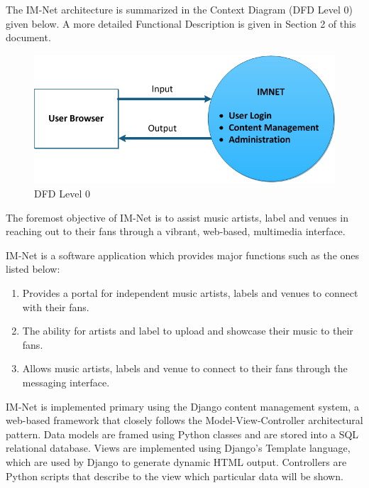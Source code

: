\documentclass[letterpaper]{article}
\begin{document}
The IM-Net architecture is summarized in the Context Diagram (DFD Level 0) given below. A more detailed Functional Description is given in Section 2 of this document.\\

\begin{figure}[h]
\centering
\includegraphics{DFD_level_0.png}
\caption{DFD Level 0}
\label{fig:DFD_level_0}
\end{figure}
\eject

The foremost objective of IM-Net is to assist music artists, label and venues in reaching out to their fans through a vibrant, web-based, multimedia interface.

IM-Net is a software application which provides major functions such as the ones listed below:

\begin{enumerate}
\item  Provides a portal for independent music artists, labels and venues to connect with their fans.

\item  The ability for artists and label to upload and showcase their music to their fans.

\item  Allows music artists, labels and venue to connect to their fans through the messaging interface.
\end{enumerate}

IM-Net is implemented primary using the Django content management system, a web-based framework that closely follows the Model-View-Controller architectural pattern. Data models are framed using Python classes and are stored into a SQL relational database. Views are implemented using Django's Template language, which are used by Django to generate dynamic HTML output. Controllers are Python scripts that describe to the view which particular data will be shown. 
\end{document}
